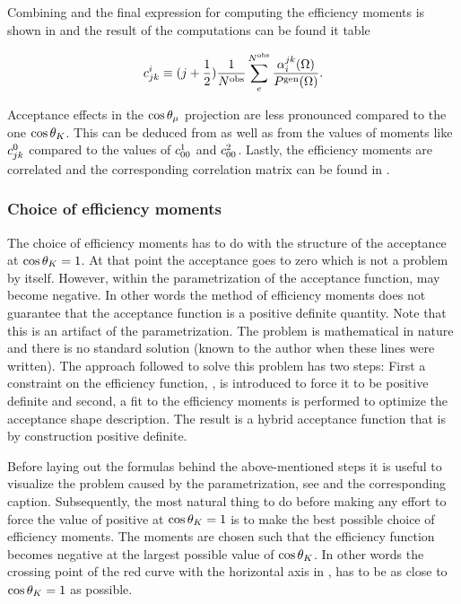 \noindent Combining  and  the final expression for computing the efficiency moments is shown
in  and the result of the computations can be found it table 

\begin{equation}
\centering
 c^i_{jk} \equiv (j + \frac{1}{2})  \frac{1}{\Nobs} \sum_e^{\Nobs} \frac{\effbase}{\Pgen}.
  \label{eff_moms_calc_final}
\end{equation}

\noindent Acceptance effects in the $\cos\theta_{\mu}$ projection are less pronounced compared to the one $\cos\theta_{K}$.
This can be deduced from  as well as from the values of moments like $c^{0}_{jk}$
compared to the values of $c^{1}_{00}$ and $c^{2}_{00}$. Lastly, the efficiency moments are
correlated and the corresponding correlation matrix can be found in .

\subsubsection{Choice of efficiency moments}
The choice of efficiency moments has to do with the structure of the acceptance at $\cos\theta_{K}=1$. At that point the acceptance goes to zero
which is not a problem by itself. However, within the parametrization of the acceptance function,  may become negative.
In other words the method of efficiency moments does not guarantee that the acceptance function is a positive definite quantity.
Note that this is an artifact of the parametrization. The problem is mathematical in nature and there is no standard solution (known
to the author when these lines were written). The approach followed to solve this problem has two steps: First a constraint on the
efficiency function, , is introduced to force it to be positive definite and second, a fit to the efficiency
moments is performed to optimize the acceptance shape description. The result is a hybrid acceptance function that is by
construction positive definite.

Before laying out the formulas behind the above-mentioned steps it is useful to visualize the problem caused by the parametrization, see 
and the corresponding caption. Subsequently, the most natural thing to do before making any effort to force the value of 
positive at $\cos\theta_{K}=1$ is to make the best possible choice of efficiency moments. The moments are chosen such that the efficiency function becomes negative
at the largest possible value of $\cos\theta_{K}$. In other words the crossing point of the red curve with the horizontal axis in ,
has to be as close to $\cos\theta_{K}=1$ as possible.

